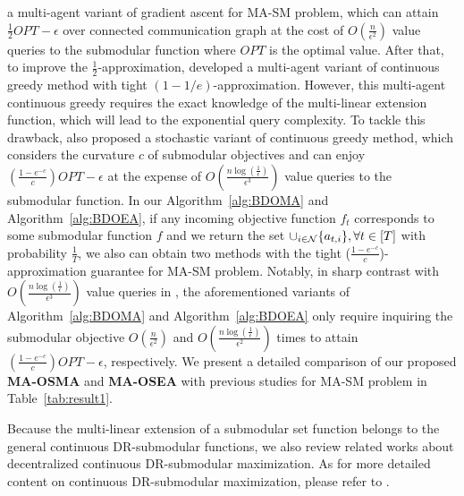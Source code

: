 a multi-agent variant of gradient ascent for MA-SM problem, which can attain $\frac{1}{2}OPT-\epsilon$ over connected communication graph at the cost of $O(\frac{n}{\epsilon^{2}})$ value queries to the submodular function where $OPT$ is the optimal value. After that, to improve the  $\frac{1}{2}$-approximation, \citet{robey2021optimal} developed a multi-agent variant of continuous greedy method\citep{calinescu2011maximizing,chekuri2014submodular} with tight $(1-1/e)$-approximation. However, this multi-agent continuous greedy\citep{robey2021optimal} requires the exact knowledge of the multi-linear extension function, which will lead to the exponential query complexity. To tackle this drawback, \citet{rezazadeh2023distributed} also proposed a stochastic variant of continuous greedy method\citep{calinescu2011maximizing,chekuri2014submodular}, which considers the curvature $c$ of submodular objectives and can enjoy $(\frac{1-e^{-c}}{c})OPT-\epsilon$ at the expense of $O(\frac{n\log(\frac{1}{\epsilon})}{\epsilon^{3}})$ value queries to the submodular function. In our Algorithm~\ref{alg:BDOMA} and Algorithm~\ref{alg:BDOEA}, if any incoming objective function $f_{t}$ corresponds to some submodular function $f$ and we return the set $\cup_{i\in\mathcal{N}}\{a_{t,i}\},\forall t\in[T]$  with probability $\frac{1}{T}$, we also can obtain two methods with the tight ($\frac{1-e^{-c}}{c}$)-approximation guarantee for MA-SM problem. Notably, in sharp contrast with $O(\frac{n\log(\frac{1}{\epsilon})}{\epsilon^{3}})$ value queries in \citep{rezazadeh2023distributed}, the aforementioned variants of Algorithm~\ref{alg:BDOMA} and Algorithm~\ref{alg:BDOEA} only require inquiring the submodular objective $O(\frac{n}{\epsilon^{2}})$ and $O(\frac{n\log(\frac{1}{\epsilon})}{\epsilon^{2}})$ times to attain $(\frac{1-e^{-c}}{c})OPT-\epsilon$, respectively. We present a detailed comparison of our proposed \textbf{MA-OSMA} and \textbf{MA-OSEA} with previous studies for MA-SM problem in Table~\ref{tab:result1}.


Because the multi-linear extension of a submodular set function belongs to the general continuous DR-submodular functions, we also review related works about decentralized continuous DR-submodular maximization. As for more detailed content on continuous DR-submodular maximization, please refer to \citet{NEURIPS2023_c041d58d,DBLP:conf/iclr/PedramfarNQA24}.

